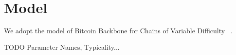 \section{Model}

We adopt the model of Bitcoin Backbone for Chains of Variable Difficulty
~\cite{variable-backbone}.

TODO Parameter Names, Typicality...
